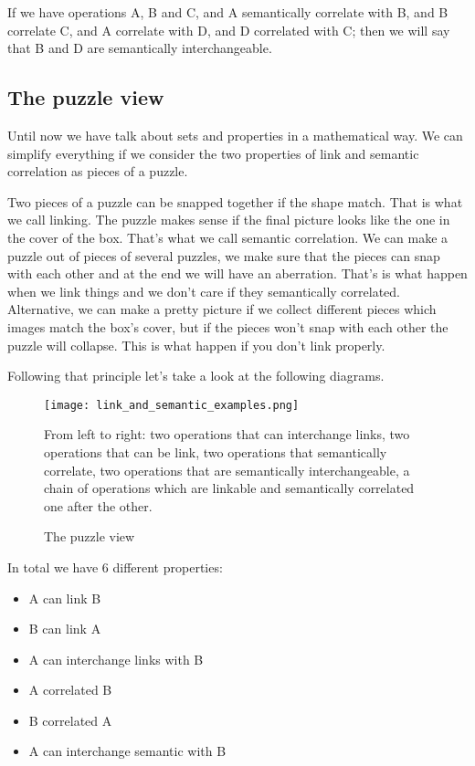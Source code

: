 \documentclass[a4paper,10pt]{article}
\begin{document}
  If we have operations A, B and C, and A semantically correlate with B, and B correlate C, and A correlate with D, and D correlated with C; then we will say that B and D are semantically interchangeable.

  \subsection{The puzzle view}
  \label{sec:puzzleview}

  Until now we have talk about sets and properties in a mathematical way. We can simplify everything if we consider the two properties of link and semantic correlation as pieces of a puzzle.\vspace{3 mm}

  Two pieces of a puzzle can be snapped together if the shape match. That is what we call linking. The puzzle makes sense if the final picture looks like the one in the cover of the box. That's what we call semantic correlation. We can make a puzzle out of pieces of several puzzles, we make sure that the pieces can snap with each other and at the end we will have an aberration. That's is what happen when we link things and we don't care if they semantically correlated. Alternative, we can make a pretty picture if we collect different pieces which images match the box's cover, but if the pieces won't snap with each other the puzzle will collapse. This is what happen if you don't link properly.\vspace{3 mm}

  Following that principle let's take a look at the following diagrams.

  \begin{figure}[H]
  {\centering
  \texttt{[image: link\_and\_semantic\_examples.png]}
  \caption{The puzzle view} \label{fig:puzzleview}}
  \medskip
  \small
  From left to right: two operations that can interchange links, two operations that can be link, two operations that semantically correlate, two operations that are semantically interchangeable, a chain of operations which are linkable and semantically correlated one after the other.
  \end{figure}

  In total we have 6 different properties:
  \begin{itemize}
  \item A can link B
  \item B can link A
  \item A can interchange links with B
  \item A correlated B
  \item B correlated A
  \item A can interchange semantic with B
  \end{itemize}
\end{document}
